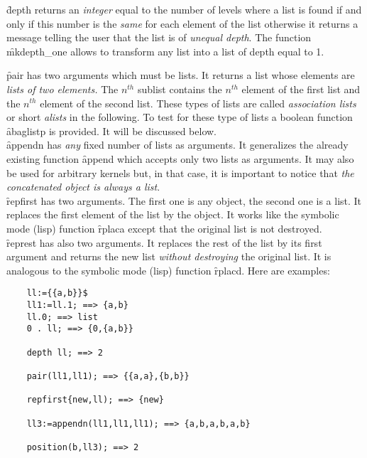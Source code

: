 \begin{itemize}
\f{depth} returns an \emph{integer} equal to the number of levels where a
list is found if and only if this number is the \emph{same} for each
element of the list  otherwise it returns a message telling the user
that the list is of \emph{unequal depth}. The function \f{mkdepth\_one}
allows to transform any list into a list of depth equal to 1.

\f{pair} has two arguments which must be lists. It returns a list
whose elements are \emph{lists of two elements.}
The $n^{th}$ sublist contains the $n^{th}$ element of the first list
and the $n^{th}$ element of the second list. These types of lists are called
\emph{association lists} or short \emph{alists} in the following.
To test for these type of lists a boolean function \f{abaglistp}
is provided. It will be discussed below.\\
\f{appendn} has \emph{any} fixed number of lists as arguments. It
generalizes the already existing function \f{append} which accepts
only two lists as arguments. It may also be used for arbitrary kernels 
but, in that case, it is important to notice that \emph{the concatenated 
object is always a list}.\\
\f{repfirst} has two arguments. The first one is any object, the second one
is a list. It replaces the first element of the list by the object. It
works like the symbolic mode (lisp) function \f{rplaca} except that the
original list is not destroyed.\\
\f{represt} has also two arguments. It replaces the rest of the list by
its first argument and returns the new list \emph{without destroying} the
original list. It is analogous to the symbolic mode (lisp) function \f{rplacd}.
Here are examples:
\begin{verbatim}
    ll:={{a,b}}$
    ll1:=ll.1; ==> {a,b}
    ll.0; ==> list
    0 . ll; ==> {0,{a,b}}

    depth ll; ==> 2

    pair(ll1,ll1); ==> {{a,a},{b,b}}

    repfirst{new,ll); ==> {new}

    ll3:=appendn(ll1,ll1,ll1); ==> {a,b,a,b,a,b}

    position(b,ll3); ==> 2


\end{verbatim}
\end{itemize}
